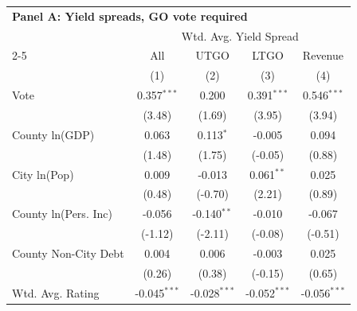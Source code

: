 \begingroup
\centering
\begin{tabular*}{\textwidth}{@{\extracolsep{\fill}}lcccc}
\multicolumn{5}{l}{\textbf{Panel A: Yield spreads, GO vote required}}\\

\addlinespace
   \toprule
                               & \multicolumn{4}{c}{Wtd. Avg. Yield Spread}\\  
   \cmidrule(lr){2-5}
                               & All                    & UTGO                          & LTGO                          & Revenue \\   
                               & (1)                    & (2)                           & (3)                           & (4)\\  
   \midrule 
   Vote                        & 0.357$^{***}$          & 0.200                         & 0.391$^{***}$                 & 0.546$^{***}$\\   
                               & (3.48)                & (1.69)                       & (3.95)                       & (3.94)\\   
   County ln(GDP)              & 0.063                  & 0.113$^{*}$                   & -0.005                        & 0.094\\   
                               & (1.48)                & (1.75)                       & (-0.05)                      & (0.88)\\   
   City ln(Pop)                & 0.009                  & -0.013                        & 0.061$^{**}$                  & 0.025\\   
                               & (0.48)                & (-0.70)                      & (2.21)                       & (0.89)\\   
   County ln(Pers. Inc)        & -0.056                 & -0.140$^{**}$                 & -0.010                        & -0.067\\   
                               & (-1.12)               & (-2.11)                      & (-0.08)                      & (-0.51)\\   
   County Non-City Debt        & 0.004                  & 0.006                         & -0.003                        & 0.025\\   
                               & (0.26)                & (0.38)                       & (-0.15)                      & (0.65)\\   
   Wtd. Avg. Rating            & -0.045$^{***}$         & -0.028$^{***}$                & -0.052$^{***}$                & -0.056$^{***}$\\   

\end{tabular*}
